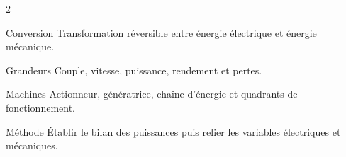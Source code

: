 \documentclass[a3paper,landscape,10pt]{article}
\begin{document}
\begin{multicols}{2}
\begin{TLPosterBloc}{Conversion}
Transformation réversible entre énergie électrique et énergie mécanique.
\end{TLPosterBloc}

\begin{TLPosterBloc}{Grandeurs}
Couple, vitesse, puissance, rendement et pertes.
\end{TLPosterBloc}

\begin{TLPosterBloc}{Machines}
Actionneur, génératrice, chaîne d'énergie et quadrants de fonctionnement.
\end{TLPosterBloc}

\begin{TLPosterBloc}{Méthode}
Établir le bilan des puissances puis relier les variables électriques et mécaniques.
\end{TLPosterBloc}
\end{multicols}
\end{document}

